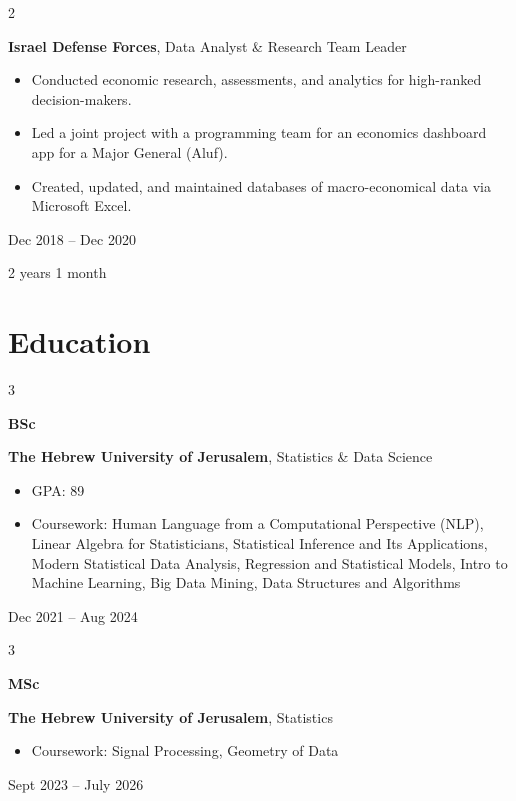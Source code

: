 \documentclass[10pt, letterpaper]{article}
\newenvironment{highlights}{
    \begin{itemize}[
        topsep=0.10 cm,
        parsep=0.10 cm,
        partopsep=0pt,
        itemsep=0pt,
        leftmargin=0.4 cm + 10pt
    ]
}{
    \end{itemize}
} %
\newenvironment{twocolentry}[2][]{
    \onecolentry
    \def\secondColumn{#2}
    \setcolumnwidth{\fill, 4.5 cm}
    \begin{paracol}{2}
}{
    \switchcolumn \raggedleft \secondColumn
    \end{paracol}
    \endonecolentry
} %
\newenvironment{threecolentry}[3][]{
    \onecolentry
    \def\thirdColumn{#3}
    \setcolumnwidth{1 cm, \fill, 4.5 cm}
    \begin{paracol}{3}
    {\raggedright #2} \switchcolumn
}{
    \switchcolumn \raggedleft \thirdColumn
    \end{paracol}
    \endonecolentry
} %
\begin{document}
        \begin{twocolentry}{
            Dec 2018 – Dec 2020

        2 years 1 month
        }
            \textbf{Israel Defense Forces}, Data Analyst \& Research Team Leader
            \begin{highlights}
                \item Conducted economic research, assessments, and analytics for high-ranked decision-makers.
                \item Led a joint project with a programming team for an economics dashboard app for a Major General (Aluf).
                \item Created, updated, and maintained databases of macro-economical data via Microsoft Excel.
            \end{highlights}
        \end{twocolentry}



    
    \section{Education}



        
        \begin{threecolentry}{\textbf{BSc}}{
            Dec 2021 – Aug 2024
        }
            \textbf{The Hebrew University of Jerusalem}, Statistics \& Data Science
            \begin{highlights}
                \item GPA: 89
                \item Coursework: Human Language from a Computational Perspective (NLP), Linear Algebra for Statisticians, Statistical Inference and Its Applications, Modern Statistical Data Analysis, Regression and Statistical Models, Intro to Machine Learning, Big Data Mining, Data Structures and Algorithms
            \end{highlights}
        \end{threecolentry}

        \vspace{0.2 cm}

        \begin{threecolentry}{\textbf{MSc}}{
            Sept 2023 – July 2026
        }
            \textbf{The Hebrew University of Jerusalem}, Statistics
            \begin{highlights}
                \item Coursework: Signal Processing, Geometry of Data
            \end{highlights}
        \end{threecolentry}
\end{document}

